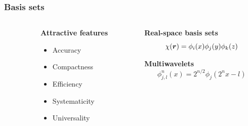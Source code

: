 \begin{frame}
    \frametitle{Basis sets}
    \begin{columns}
    \begin{column}{.10\textwidth}
    \end{column}
    \begin{column}{.30\textwidth}
    \textbf{Attractive features}
    \begin{itemize}
        \item {\color{green} Accuracy}
        \item {\color{red} Compactness}
        \item {\color{green} Efficiency}
        \item {\color{green} Systematicity}
        \item {\color{green} Universality}
    \end{itemize}
    \end{column}
    \begin{column}{.60\textwidth}
    \centering
    \textbf{Real-space basis sets}
    \begin{equation}
        \nonumber
        \chi(\boldsymbol r) = \phi_i(x)\phi_j(y)\phi_k(z)
    \end{equation}
    
    \vspace{4.2mm}

    \textbf{Multiwavelets}
    \begin{equation}
        \nonumber
        \phi_{j,l}^n(x) = 2^{n/2}\phi_j(2^nx-l)
    \end{equation}
    \end{column}
    \end{columns}    

    \vspace{5mm}


\end{frame}
